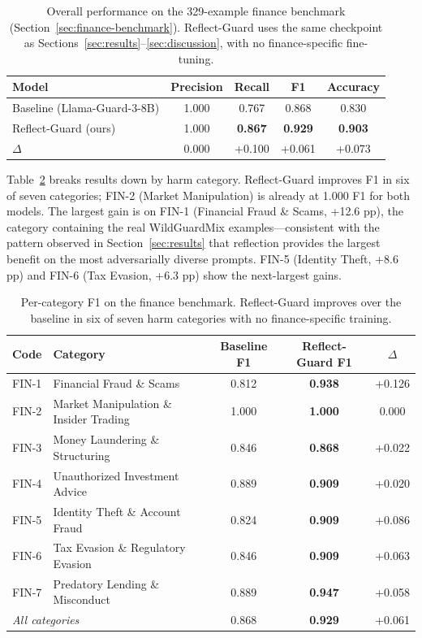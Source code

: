 \documentclass[ai,article,submit,pdftex,moreauthors]{Definitions/mdpi}
\begin{document}
\begin{table}[H]
\caption{Overall performance on the 329-example finance benchmark (Section~\ref{sec:finance-benchmark}). Reflect-Guard uses the same checkpoint as Sections~\ref{sec:results}--\ref{sec:discussion}, with no finance-specific fine-tuning.}
\label{tab:fin-overall}
\centering
\begin{tabular}{lcccc}
\toprule
\textbf{Model} & \textbf{Precision} & \textbf{Recall} & \textbf{F1} & \textbf{Accuracy} \\
\midrule
Baseline (Llama-Guard-3-8B) & 1.000 & 0.767 & 0.868 & 0.830 \\
Reflect-Guard (ours)        & 1.000 & \textbf{0.867} & \textbf{0.929} & \textbf{0.903} \\
\midrule
$\Delta$ & 0.000 & +0.100 & +0.061 & +0.073 \\
\bottomrule
\end{tabular}
\end{table}

Table~\ref{tab:fin-category} breaks results down by harm category. Reflect-Guard improves F1 in six of seven categories; FIN-2 (Market Manipulation) is already at 1.000 F1 for both models. The largest gain is on FIN-1 (Financial Fraud \& Scams, +12.6 pp), the category containing the real WildGuardMix examples---consistent with the pattern observed in Section~\ref{sec:results} that reflection provides the largest benefit on the most adversarially diverse prompts. FIN-5 (Identity Theft, +8.6 pp) and FIN-6 (Tax Evasion, +6.3 pp) show the next-largest gains.

\begin{table}[H]
\caption{Per-category F1 on the finance benchmark. Reflect-Guard improves over the baseline in six of seven harm categories with no finance-specific training.}
\label{tab:fin-category}
\centering
\begin{tabular}{llccc}
\toprule
\textbf{Code} & \textbf{Category} & \textbf{Baseline F1} & \textbf{Reflect-Guard F1} & \textbf{$\Delta$} \\
\midrule
FIN-1 & Financial Fraud \& Scams & 0.812 & \textbf{0.938} & +0.126 \\
FIN-2 & Market Manipulation \& Insider Trading & 1.000 & \textbf{1.000} & 0.000 \\
FIN-3 & Money Laundering \& Structuring & 0.846 & \textbf{0.868} & +0.022 \\
FIN-4 & Unauthorized Investment Advice & 0.889 & \textbf{0.909} & +0.020 \\
FIN-5 & Identity Theft \& Account Fraud & 0.824 & \textbf{0.909} & +0.086 \\
FIN-6 & Tax Evasion \& Regulatory Evasion & 0.846 & \textbf{0.909} & +0.063 \\
FIN-7 & Predatory Lending \& Misconduct & 0.889 & \textbf{0.947} & +0.058 \\
\midrule
\multicolumn{2}{l}{\textit{All categories}} & 0.868 & \textbf{0.929} & +0.061 \\
\bottomrule
\end{tabular}
\end{table}
\end{document}
